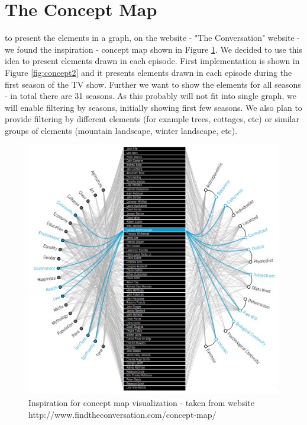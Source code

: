 \documentclass[a4paper]{tufte-book}
\begin{document}
\section{The Concept Map}
 to present the elements in a graph, on the website 
 - "The Conversation" website -  we found the inspiration - concept map shown in Figure \ref{fig:concept1}. We decided to use this idea to present elements drawn in each episode. First implementation is shown in Figure \ref{fig:concept2} and it presents elements drawn in each episode during the first season of the TV show. Further we want to show the elements for all seasons - in total there are 31 seasons. As this probably will not fit into single graph, we will enable filtering by seasons, initially showing first few seasons. We also plan to provide filtering by different elements (for example trees, cottages, etc) or similar groups of elements (mountain landscape, winter landscape, etc).

\begin{figure}
	\includegraphics{Images/conceptMapIdea.png}
	\caption{Inspiration for concept map visualization - taken from website http://www.findtheconversation.com/concept-map/}
	\label{fig:concept1}
\end{figure}
\end{document}
